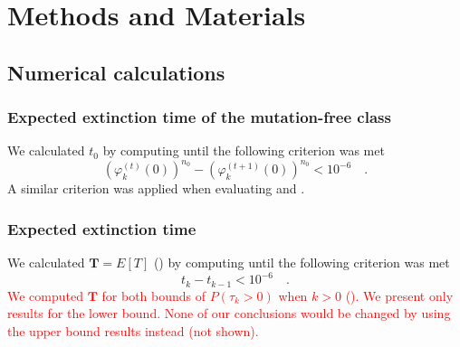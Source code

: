 \documentclass[9pt,lineno]{elife}
\newcommand{\red}{\textcolor{red}}
\begin{document}
%
%
%
%






\section{Methods and Materials}




\subsection{Numerical calculations}

\subsubsection{Expected extinction time of the mutation-free class}
We calculated $t_0$ by computing  until the following criterion was met 
%
\begin{equation*}
\left(\varphi_{k}^{(t)}(0)\right)^{n_{0}} - \left(\varphi_{k}^{(t+1)}(0)\right)^{n_{0}} < 10^{-6} \quad .
\end{equation*}
%
A similar criterion was applied when evaluating  and . 

\subsubsection{Expected extinction time}
We calculated $\mathbf{T}=E[T]$ () by computing  until the following criterion was met 
%
\begin{equation*}
t_k - t_{k-1} < 10^{-6} \quad .
\end{equation*}
%
\red{We computed $\mathbf{T}$ for both bounds of $P(\tau_{k} > 0)$ when $k>0$ ().  We present only results for the lower bound.  None of our conclusions would be changed by using the upper bound results instead (not shown).}
\end{document}

